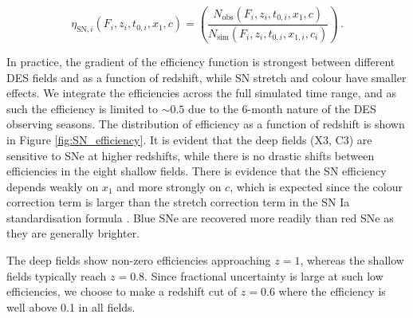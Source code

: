 \documentclass[fleqn,usenatbib]{mnras}
\begin{document}
\begin{equation}
    \eta_{\mathrm{SN},i} (F_i,z_i,t_{0,i},x_1,c) = \left( \frac{N_{\mathrm{obs}}\left(F_i,z_i,t_{0,i},x_1,c\right)}{N_{\mathrm{sim}}\left(F_i,z_i,t_{0,i},x_{1,i},c_i\right)}\right)\,.
\end{equation}

In practice, the gradient of the efficiency function is strongest between different DES fields and as a function of redshift, while SN stretch and colour have smaller effects. We integrate the efficiencies across the full simulated time range, and as such the efficiency is limited to $\sim 0.5$ due to the 6-month nature of the DES observing seasons.
The distribution of efficiency as a function of redshift is shown in Figure \ref{fig:SN_efficiency}. It is evident that the deep fields (X3, C3) are sensitive to SNe at higher redshifts, while there is no drastic shifts between efficiencies in the eight shallow fields. There is evidence that the SN efficiency depends weakly on $x_1$ and more strongly on $c$, which is expected since the colour correction term is larger than the stretch correction term in the SN Ia standardisation formula \citep{Tripp1998}. Blue SNe are recovered more readily than red SNe as they are generally brighter. 

The deep fields show non-zero efficiencies approaching $z=1$, whereas the shallow fields typically reach $z=0.8$. Since fractional uncertainty is large at such low efficiencies, we choose to make a redshift cut of $z=0.6$ where the efficiency is well above 0.1 in all fields. 
\end{document}
